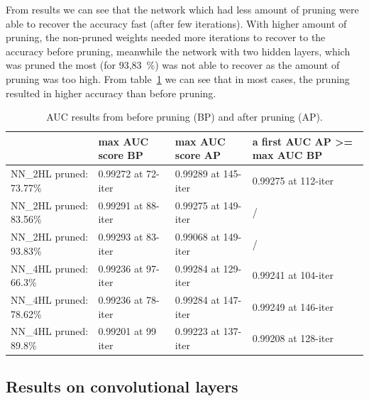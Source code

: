 \documentclass{article} %
\begin{document}
From results we can see 
that the network which had less amount of pruning were able to recover the 
accuracy fast (after few iterations). With higher amount of pruning, 
the non-pruned weights needed more iterations to recover to the accuracy before 
pruning, meanwhile the network with two hidden layers, which was pruned the most 
(for 93,83~\%) was not able to recover as the amount of pruning was too high.
From table~\ref{t:results} we can see that in most cases, the pruning resulted
in higher accuracy than before pruning. 


\begin{table}[!ht]
\centering
\begin{tabular}{l|l|l|p{3cm}|}
\cline{2-4}
 & max AUC score BP & max AUC score AP & a first AUC AP \textgreater= max AUC BP 
\\ \hline
\multicolumn{1}{|l|}{NN\_2HL pruned: 73.77\%} & 0.99272 at 72-iter & 0.99289 at 
145-iter & 0.99275 at 112-iter \\ \hline
\multicolumn{1}{|l|}{NN\_2HL pruned: 83.56\%} & 0.99291 at 88-iter & 0.99275 at 
149-iter & / \\ \hline
\multicolumn{1}{|l|}{NN\_2HL pruned: 93.83\%} & 0.99293 at 83-iter & 0.99068 at 
149-iter & / \\ \hline
\multicolumn{1}{|l|}{NN\_4HL pruned: 66.3\%} & 0.99236 at 97-iter & 0.99284 at 
129-iter & 0.99241 at 104-iter \\ \hline
\multicolumn{1}{|l|}{NN\_4HL pruned: 78.62\%} & 0.99236 at 78-iter & 0.99284 at 
147-iter & 0.99249 at 146-iter \\ \hline
\multicolumn{1}{|l|}{NN\_4HL pruned: 89.8\%} & 0.99201 at 99 iter & 0.99223 at 
137-iter & 0.99208 at 128-iter \\ \hline
\end{tabular}
\caption{AUC results from before pruning (BP) and after pruning (AP).}
\label{t:results}
\end{table}

\subsection{Results on convolutional layers}

\newpage 
\end{document}
